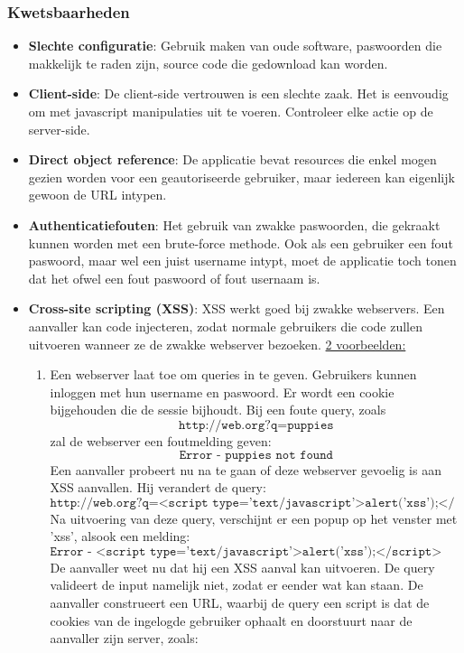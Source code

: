 \documentclass{report}
\begin{document}
	\subsubsection{Kwetsbaarheden}
	\begin{itemize}
		\item[\info] \textbf{Slechte configuratie}: Gebruik maken van oude software, paswoorden die makkelijk te raden zijn, source code die gedownload kan worden.
		\item[\info] \textbf{Client-side}: De client-side vertrouwen is een slechte zaak. Het is eenvoudig om met javascript manipulaties uit te voeren. Controleer elke actie op de server-side.
		\item[\info] \textbf{Direct object reference}: De applicatie bevat resources die enkel mogen gezien worden voor een geautoriseerde gebruiker, maar iedereen kan eigenlijk gewoon de URL intypen.
		\item[\info] \textbf{Authenticatiefouten}: Het gebruik van zwakke paswoorden, die gekraakt kunnen worden met een brute-force methode. Ook als een gebruiker een fout paswoord, maar wel een juist username intypt, moet de applicatie toch tonen dat het ofwel een fout paswoord of fout usernaam is.
		\item[\info] \textbf{Cross-site scripting (XSS)}: XSS werkt goed bij zwakke webservers. Een aanvaller kan code injecteren, zodat normale gebruikers die code zullen uitvoeren wanneer ze de zwakke webserver bezoeken. \underline{2 voorbeelden:}
		\begin{enumerate}
			\item Een webserver laat toe om queries in te geven. Gebruikers kunnen inloggen met hun username en paswoord. Er wordt een cookie bijgehouden die de sessie bijhoudt. Bij een foute query, zoals 
			$$\texttt{http://web.org?q=puppies}$$ zal de webserver een foutmelding geven:
			$$\texttt{Error - puppies not found}$$
			Een aanvaller probeert nu na te gaan of deze webserver gevoelig is aan XSS aanvallen. Hij verandert de query:
			$$\texttt{http://web.org?q=<script type='text/javascript'>alert('xss');</script>}$$
			Na uitvoering van deze query, verschijnt er een popup op het venster met 'xss', alsook een melding:
			$$\texttt{Error - <script type='text/javascript'>alert('xss');</script> not found}$$
			De aanvaller weet nu dat hij een XSS aanval kan uitvoeren. De query valideert de input namelijk niet, zodat er eender wat kan staan. De aanvaller construeert een URL, waarbij de query een script is dat de cookies van de ingelogde gebruiker ophaalt en doorstuurt naar de aanvaller zijn server, zoals:

\end{enumerate}
\end{itemize}
\end{document}
